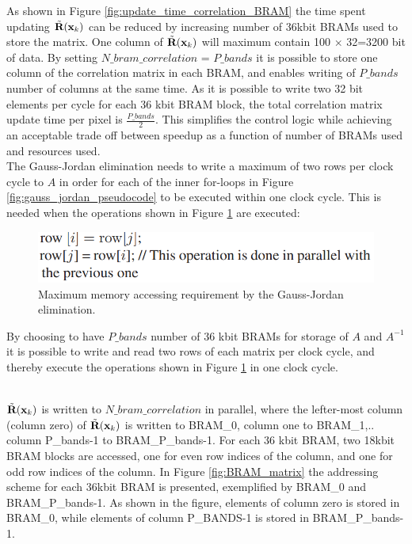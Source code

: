 As shown in Figure \ref{fig:update_time_correlation_BRAM} the time spent updating $\Tilde{\textbf{R}}(\textbf{x}_k)$ can be reduced by increasing number of 36kbit BRAMs used to store the matrix. One column of $\Tilde{\textbf{R}}(\textbf{x}_k)$ will maximum contain 100 $\times$ 32=3200 bit of data. By setting $N\_bram\_correlation$ = $P\_bands$ it is possible to store one column of the correlation matrix in each BRAM, and enables writing of $P\_bands$ number of columns at the same time. As it is possible to write two 32 bit elements per cycle for each 36 kbit BRAM block, the total correlation matrix update time per pixel is $\frac{P\_bands}{2}$. 
 This simplifies the control logic while achieving an acceptable trade off between speedup as a function of number of BRAMs used and resources used. %
\\



The Gauss-Jordan elimination needs to write a maximum of two rows per clock cycle to $A$ in order for each of the inner for-loops in Figure \ref{fig:gauss_jordan_pseudocode} to be executed within one clock cycle. This is needed when the operations shown in Figure \ref{fig:max_memory_requirements_gauss_jordan} are executed:

\begin{figure}[H]
\centering
   \includegraphics[scale=0.6]{images/max_memory_operations_gauss_jordan.png}%
  \caption{Maximum memory accessing requirement by the Gauss-Jordan elimination. } 
  \label{fig:max_memory_requirements_gauss_jordan}
\end{figure}

By choosing to have $P\_bands$ number of 36 kbit BRAMs for storage of $A$ and $A^{-1}$ it is possible to write and read two rows of each matrix per clock cycle, and thereby execute the operations shown in Figure \ref{fig:max_memory_requirements_gauss_jordan} in one clock cycle. 

\\
 $\Tilde{\textbf{R}}(\textbf{x}_k)$ is written to $N\_bram\_correlation$ in parallel, where the lefter-most column (column zero) of  $\Tilde{\textbf{R}}(\textbf{x}_k)$ is written to BRAM\_0, column one to BRAM\_1,.. column P\_bands-1 to BRAM\_P\_bands-1. For each 36 kbit BRAM, two 18kbit BRAM blocks are accessed, one for even row indices of the column, and one for odd row indices of the column. In Figure \ref{fig:BRAM_matrix} the addressing scheme for each 36kbit BRAM is presented, exemplified by BRAM\_0 and BRAM\_P\_bands-1. As shown in the figure, elements of column zero is stored in BRAM\_0, while elements of column P\_BANDS-1 is stored in BRAM\_P\_bands-1.


